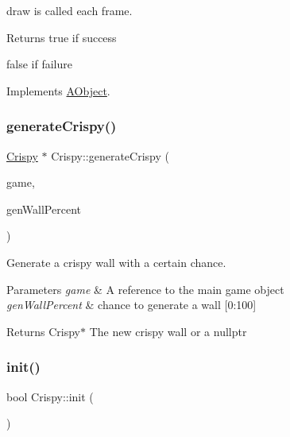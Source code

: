 draw is called each frame. 

\begin{DoxyReturn}{Returns}
true if success 

false if failure 
\end{DoxyReturn}


Implements \hyperlink{class_a_object_a5e454e13e04ee937c20a465244cf748a}{A\+Object}.

\mbox{\label{class_crispy_a30d88975d3874ed4a9d2216abefbf2c0}} 
\subsubsection{\texorpdfstring{generate\+Crispy()}{generateCrispy()}}
{\footnotesize\ttfamily \hyperlink{class_crispy}{Crispy} $\ast$ Crispy\+::generate\+Crispy (\begin{DoxyParamCaption}\item[{\hyperlink{class_scene_game}{Scene\+Game} \&}]{game,  }\item[{uint32\+\_\+t}]{gen\+Wall\+Percent }\end{DoxyParamCaption})\hspace{0.3cm}{\ttfamily [static]}}



Generate a crispy wall with a certain chance. 


\begin{DoxyParams}{Parameters}
{\em game} & A reference to the main game object \\
\hline
{\em gen\+Wall\+Percent} & chance to generate a wall \mbox{[}0\+:100\mbox{]} \\
\hline
\end{DoxyParams}
\begin{DoxyReturn}{Returns}
Crispy$\ast$ The new crispy wall or a nullptr 
\end{DoxyReturn}
\mbox{\label{class_crispy_aef91bfa94d0506d25b4cf78098e57912}} 
\subsubsection{\texorpdfstring{init()}{init()}}
{\footnotesize\ttfamily bool Crispy\+::init (\begin{DoxyParamCaption}{ }\end{DoxyParamCaption})\hspace{0.3cm}{\ttfamily [virtual]}}



